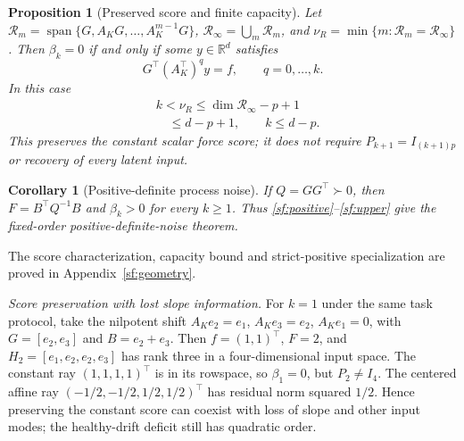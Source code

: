 \documentclass[journal]{IEEEtran}
\newtheorem{proposition}{Proposition}
\newtheorem{corollary}{Corollary}
\begin{document}
\begin{proposition}[Preserved score and finite capacity]\label{sf:capacity}
Let $\mathcal R_m=\operatorname{span}\{G,A_KG,\ldots,A_K^{m-1}G\}$,
$\mathcal R_\infty=\bigcup_m\mathcal R_m$, and
$\nu_R=\min\{m:\mathcal R_m=\mathcal R_\infty\}$.
Then $\beta_k=0$ if and only if some $y\in\mathbb R^d$ satisfies
\begin{equation}\label{sf:score}
G^\top(A_K^\top)^q y=f,\qquad q=0,\ldots,k.
\end{equation}
In this case
\begin{equation}\label{sf:capacity-bound}
\begin{aligned}
&k<\nu_R\le\dim\mathcal R_\infty-p+1\\
&\quad\le d-p+1,\qquad k\le d-p.
\end{aligned}
\end{equation}
This preserves the constant scalar force score; it does not require
$P_{k+1}=I_{(k+1)p}$ or recovery of every latent input.
\end{proposition}

\begin{corollary}[Positive-definite process noise]\label{sf:spd}
If $Q=GG^\top\succ0$, then $F=B^\top Q^{-1}B$ and
$\beta_k>0$ for every $k\ge1$. Thus \eqref{sf:positive}--\eqref{sf:upper}
give the fixed-order positive-definite-noise theorem.
\end{corollary}
The score characterization, capacity bound and strict-positive specialization
are proved in Appendix~\ref{sf:geometry}.

\par\smallskip\noindent\textit{Score preservation with lost slope information.}\enspace 
For $k=1$ under the same task protocol, take the nilpotent shift
$A_Ke_2=e_1$, $A_Ke_3=e_2$, $A_Ke_1=0$, with
$G=[e_2,e_3]$ and $B=e_2+e_3$. Then $f=(1,1)^\top$, $F=2$, and
$H_2=[e_1,e_2,e_2,e_3]$ has rank three in a four-dimensional input space.
The constant ray $(1,1,1,1)^\top$ is in its rowspace, so $\beta_1=0$,
but $P_2\ne I_4$. The centered affine ray
$(-1/2,-1/2,1/2,1/2)^\top$ has residual norm squared $1/2$.
Hence preserving the constant score can coexist with loss of slope and other
input modes; the healthy-drift deficit still has quadratic order.
\end{document}
